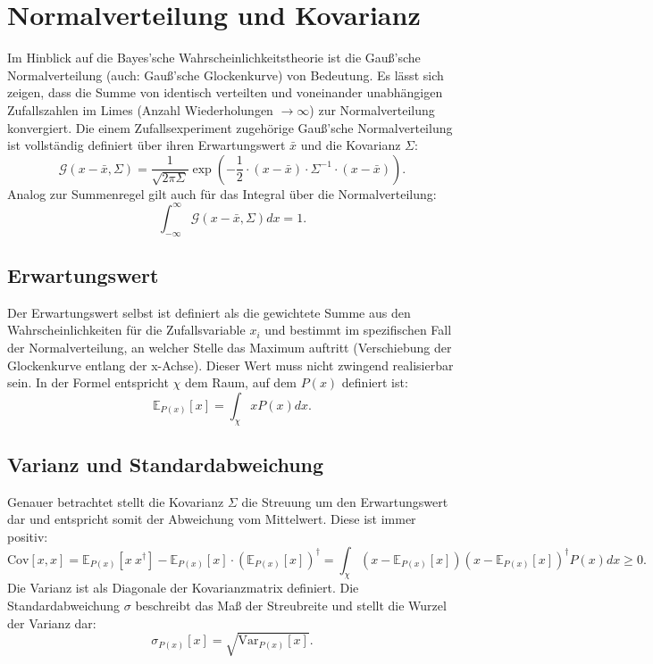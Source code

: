 \section{Normalverteilung und Kovarianz}

Im Hinblick auf die Bayes'sche Wahrscheinlichkeitstheorie ist die Gauß'sche Normalverteilung (auch: Gauß'sche Glockenkurve) von Bedeutung.
Es lässt sich zeigen, dass die Summe von identisch verteilten und voneinander unabhängigen Zufallszahlen im Limes (Anzahl Wiederholungen $\rightarrow \infty$) zur Normalverteilung konvergiert.
Die einem Zufallsexperiment zugehörige Gauß'sche Normalverteilung ist vollständig definiert über ihren Erwartungswert $\bar{x}$ und die Kovarianz $\Sigma$:
\begin{equation}
\mathcal{G} (x - \bar{x}, \Sigma) = \displaystyle\frac{1}{\sqrt{2 \pi \Sigma}} \exp \left(- \displaystyle\frac{1}{2} \cdot (x - \bar{x}) \cdot \Sigma^{-1} \cdot (x - \bar{x}) \right).
\end{equation}
Analog zur Summenregel gilt auch für das Integral über die Normalverteilung:
\begin{equation} 
\int_{- \infty}^{\infty} \mathcal{G} (x - \bar{x}, \Sigma) dx = 1.
\end{equation}

\subsection{Erwartungswert}
Der Erwartungswert selbst ist definiert als die gewichtete Summe aus den Wahrscheinlichkeiten für die Zufallsvariable $x _i$ und bestimmt im spezifischen Fall der Normalverteilung, an welcher Stelle das Maximum auftritt (Verschiebung der Glockenkurve entlang der x-Achse). Dieser Wert muss nicht zwingend realisierbar sein. In der Formel entspricht $\chi$ dem Raum, auf dem $P(x)$ definiert ist:
\begin{equation}
\mathbb{E} _{P(x)} [x] = \int_{\chi} x P(x) dx .
\end{equation}

\subsection{Varianz und Standardabweichung}
Genauer betrachtet stellt die Kovarianz $\Sigma$ die Streuung um den Erwartungswert dar und entspricht somit der Abweichung vom Mittelwert. Diese ist immer positiv:
\begin{equation}\text{Cov} [x, x] = \mathbb{E} _{P(x)} [x \ x^{\dagger}] - \mathbb{E} _{P(x)} [x] \cdot (\mathbb{E} _{P(x)} [x])^{\dagger} = \int_ {\chi} (x - \mathbb{E} _{P(x)} [x]) (x - \mathbb{E} _{P(x)} [x])^{\dagger} P(x) dx \geq 0.
\end{equation}
Die Varianz ist als Diagonale der Kovarianzmatrix definiert. Die Standardabweichung $\sigma$ beschreibt das Maß der Streubreite und stellt die Wurzel der Varianz dar:
\begin{equation}
\sigma _{P(x)} [x] = \sqrt{\text{Var} _{P(x)} [x]}.
\end{equation}

